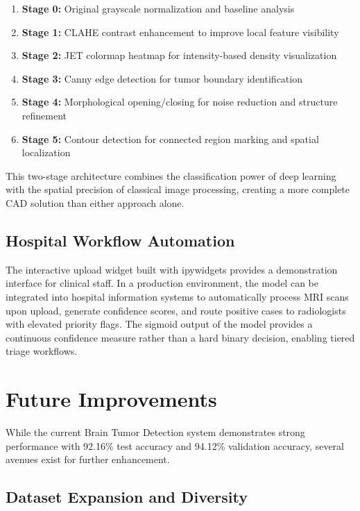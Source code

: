 \documentclass[12pt,a4paper]{article}
\begin{document}
\begin{enumerate}
    \item \textbf{Stage 0:} Original grayscale normalization and baseline analysis
    \item \textbf{Stage 1:} CLAHE contrast enhancement to improve local feature visibility
    \item \textbf{Stage 2:} JET colormap heatmap for intensity-based density visualization
    \item \textbf{Stage 3:} Canny edge detection for tumor boundary identification
    \item \textbf{Stage 4:} Morphological opening/closing for noise reduction and structure refinement
    \item \textbf{Stage 5:} Contour detection for connected region marking and spatial localization
\end{enumerate}

This two-stage architecture combines the classification power of deep learning with the spatial precision of classical image processing, creating a more complete CAD solution than either approach alone.

\subsection{Hospital Workflow Automation}

The interactive upload widget built with ipywidgets provides a demonstration interface for clinical staff. In a production environment, the model can be integrated into hospital information systems to automatically process MRI scans upon upload, generate confidence scores, and route positive cases to radiologists with elevated priority flags. The sigmoid output of the model provides a continuous confidence measure rather than a hard binary decision, enabling tiered triage workflows.

\newpage

\section{Future Improvements}

While the current Brain Tumor Detection system demonstrates strong performance with 92.16\% test accuracy and 94.12\% validation accuracy, several avenues exist for further enhancement.

\subsection{Dataset Expansion and Diversity}
\end{document}
